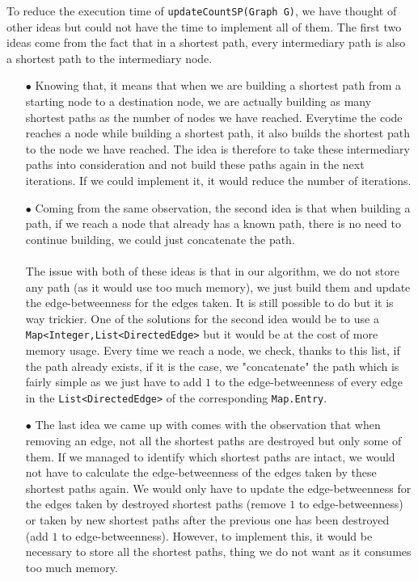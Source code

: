 \documentclass{article}
\begin{document}
To reduce the execution time of \texttt{updateCountSP(Graph G)}, we have thought of other ideas but could not have the time to implement all of them. The first two ideas come from the fact that in a shortest path, every intermediary path is also a shortest path to the intermediary node.
\begin{itemize}
\item[$\bullet$] Knowing that, it means that when we are building a shortest path from a starting node to a destination node, we are actually building as many shortest paths as the number of nodes we have reached. Everytime the code reaches a node while building a shortest path, it also builds the shortest path to the node we have reached. The idea is therefore to take these intermediary paths into consideration and not build these paths again in the next iterations. If we could implement it, it would reduce the number of iterations.
\item[$\bullet$] Coming from the same observation, the second idea is that when building a path, if we reach a node that already has a known path, there is no need to continue building, we could just concatenate the path. \\ \\
The issue with both of these ideas is that in our algorithm, we do not store any path (as it would use too much memory), we just build them and update the edge-betweenness for the edges taken. It is still possible to do but it is way trickier. One of the solutions for the second idea would be to use a \texttt{Map<Integer,List<DirectedEdge>} but it would be at the cost of more memory usage. Every time we reach a node, we check, thanks to this list, if the path already exists, if it is the case, we "concatenate" the path which is fairly simple as we just have to add $1$ to the edge-betweenness of every edge in the \texttt{List<DirectedEdge>} of the corresponding \texttt{Map.Entry}.
\item[$\bullet$] The last idea we came up with comes with the observation that when removing an edge, not all the shortest paths are destroyed but only some of them. If we managed to identify which shortest paths are intact, we would not have to calculate the edge-betweenness of the edges taken by these shortest paths again. We would only have to update the edge-betweenness for the edges taken by destroyed shortest paths (remove $1$ to edge-betweenness) or taken by new shortest paths after the previous one has been destroyed (add $1$ to edge-betweenness). However, to implement this, it would be necessary to store all the shortest paths, thing we do not want as it consumes too much memory.
\end{itemize}
\end{document}
